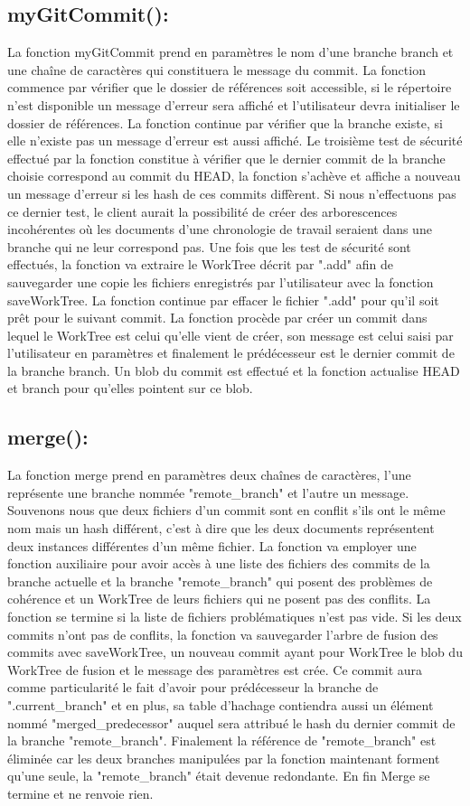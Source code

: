 \documentclass[12pt,francais]{article}
\begin{document}
\subsection{myGitCommit():}
	La fonction myGitCommit prend en paramètres le nom d'une branche branch et une chaîne de caractères qui constituera le message du commit. La fonction commence par vérifier que le dossier de références soit accessible,  si le répertoire n'est disponible un message d'erreur sera affiché et l'utilisateur devra initialiser le dossier de références.  La fonction continue par vérifier que la branche existe, si elle n'existe pas un message d'erreur est aussi affiché.  Le troisième test de sécurité effectué par la fonction constitue à vérifier que le dernier commit de la branche choisie correspond au commit du HEAD, la fonction s'achève et affiche a nouveau un message d'erreur si les hash de ces commits diffèrent. Si nous n'effectuons pas ce dernier test, le client aurait la possibilité de créer des arborescences incohérentes où les documents d'une chronologie de travail seraient dans une branche qui ne leur correspond pas. 
	Une fois que les test de sécurité sont effectués, la fonction va extraire le WorkTree décrit par ".add" afin de sauvegarder une copie les fichiers enregistrés par l'utilisateur avec la fonction saveWorkTree.  La fonction continue par effacer le fichier ".add" pour qu'il soit prêt pour le suivant commit. La fonction procède par créer un commit dans lequel le WorkTree est celui qu'elle vient de créer, son message est celui saisi par l'utilisateur en paramètres et finalement le prédécesseur est le dernier commit de la branche branch.  Un blob du commit est effectué et la fonction actualise HEAD et branch pour qu'elles pointent sur ce blob.
\subsection{merge():}
	La fonction merge prend en paramètres  deux chaînes de caractères, l'une représente une branche nommée "remote\_branch" et l'autre un message. Souvenons nous que deux fichiers d'un commit sont en conflit s'ils ont le même nom mais un hash différent, c'est à dire que les deux documents représentent deux instances différentes d'un même fichier. La fonction va employer une fonction auxiliaire pour avoir accès à une liste des fichiers des commits de la branche actuelle et la branche "remote\_branch" qui posent des problèmes de cohérence et un WorkTree de leurs fichiers qui ne posent pas des conflits. La fonction se termine si la liste de fichiers problématiques n'est pas vide. 
	Si les deux commits n'ont pas de conflits, la fonction va sauvegarder l'arbre de fusion des commits avec saveWorkTree, un nouveau commit ayant pour WorkTree le blob du WorkTree de fusion et le message des paramètres est crée. Ce commit aura comme particularité le fait d'avoir pour prédécesseur la branche de ".current\_branch" et en plus, sa table d'hachage contiendra aussi un élément nommé "merged\_predecessor" auquel sera attribué le hash du dernier commit de la branche "remote\_branch". Finalement la référence de "remote\_branch" est éliminée car les deux branches manipulées par la fonction maintenant forment qu'une seule, la "remote\_branch" était devenue redondante.  En fin Merge se termine et ne renvoie rien. 
	
\end{document}
